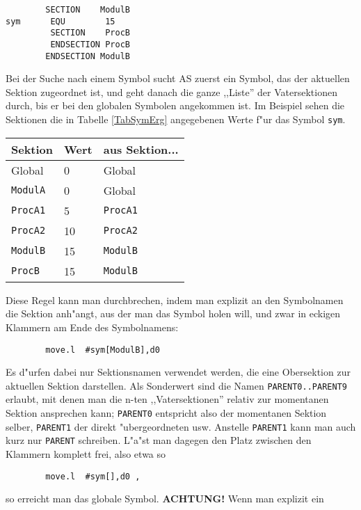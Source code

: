 \documentclass[12pt,a4paper,twoside]{report}
\newcommand{\bb}[1]{{\bf #1}}
\newcommand{\tty}[1]{{\tt #1}}
\begin{document}
{\begin{verbatim}
        SECTION    ModulB
sym      EQU        15
         SECTION    ProcB
         ENDSECTION ProcB
        ENDSECTION ModulB
\end{verbatim}
Bei der Suche nach einem Symbol sucht AS zuerst ein Symbol, das der aktuellen
Sektion zugeordnet ist, und geht danach die ganze ,,Liste'' der Vatersektionen
durch, bis er bei den globalen Symbolen angekommen ist.  Im Beispiel sehen
die Sektionen die in Tabelle \ref{TabSymErg} angegebenen Werte f"ur das Symbol
\tty{sym}.
\begin{table*}[htb]
\begin{center}\begin{tabular}{|l|l|l|}
\hline
Sektion      &    Wert   &   aus Sektion... \\
\hline
\hline
Global       &     0     &    Global        \\
\hline
\tty{ModulA} &     0     &    Global        \\
\hline
\tty{ProcA1} &     5     &    \tty{ProcA1}  \\
\hline
\tty{ProcA2} &    10     &    \tty{ProcA2}  \\
\hline
\tty{ModulB} &    15     &    \tty{ModulB}  \\
\hline
\tty{ProcB}  &    15     &    \tty{ModulB}  \\
\hline
\end{tabular}\end{center}
\caption{F"ur die einzelnen Sektionen g"ultigen Werte\label{TabSymErg}}
\end{table*}
Diese Regel kann man durchbrechen, indem man explizit an den Symbolnamen
die Sektion anh"angt, aus der man das Symbol holen will, und zwar in
eckigen Klammern am Ende des Symbolnamens:
\begin{verbatim}
        move.l  #sym[ModulB],d0
\end{verbatim}
Es d"urfen dabei nur Sektionsnamen verwendet werden, die eine Obersektion
zur aktuellen Sektion darstellen.  Als Sonderwert sind die Namen
\tty{PARENT0..PARENT9} erlaubt, mit denen man die n-ten ,,Vatersektionen''
relativ zur momentanen Sektion ansprechen kann; \tty{PARENT0} entspricht
also der momentanen Sektion selber, \tty{PARENT1} der direkt "ubergeordneten
usw.  Anstelle \tty{PARENT1} kann man auch kurz nur \tty{PARENT} schreiben.
L"a"st man dagegen den Platz zwischen den Klammern komplett frei, also
etwa so
\begin{verbatim}
        move.l  #sym[],d0 ,
\end{verbatim}
so erreicht man das globale Symbol.  \bb{ACHTUNG!} Wenn man explizit ein
}
\end{document}
